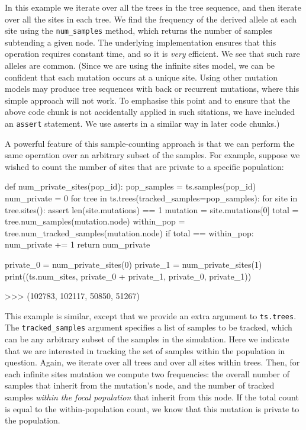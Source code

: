\documentclass[graybox]{svmult}
\begin{document}
In this example we iterate over all the trees in the tree sequence, and
then iterate over all the sites in each tree. We find the frequency
of the derived allele at each site using the \texttt{num\_samples}
method, which returns the number of samples subtending a given
node. The underlying implementation ensures that this operation requires
constant time, and so it is \emph{very} efficient. We see that such rare alleles are common.
(Since we are using the infinite sites model, we can be confident that
each mutation occurs at a unique site. Using other mutation models may produce
tree sequences with back or recurrent mutations, where this simple approach
will not work. To emphasise this point and to ensure that
the above code chunk is not accidentally applied in such sitations, we have included an
\texttt{assert} statement. We use asserts in a similar way in later code chunks.)

A powerful feature of this sample-counting approach is that we can
perform the same operation over an arbitrary subset of the samples. For
example, suppose we wished to count the number of sites that are private
to a specific population:

\begin{pythoncode}
def num_private_sites(pop_id):
    pop_samples = ts.samples(pop_id)
    num_private = 0
    for tree in ts.trees(tracked_samples=pop_samples):
        for site in tree.sites():
            assert len(site.mutations) == 1
            mutation = site.mutations[0]
            total = tree.num_samples(mutation.node)
            within_pop = tree.num_tracked_samples(mutation.node)
            if total == within_pop:
                num_private += 1
    return num_private

private_0 = num_private_sites(0)
private_1 = num_private_sites(1)
print((ts.num_sites, private_0 + private_1, private_0, private_1))

>>> (102783, 102117, 50850, 51267)
\end{pythoncode}

    This example is similar, except that we provide an extra argument to
\texttt{ts.trees}. The \texttt{tracked\_samples} argument specifies a list of samples to be tracked, which can be
any arbitrary subset of the samples in the simulation. Here we indicate
that we are interested in tracking the set of samples within the
population in question. Again, we iterate over all trees and over all
sites within trees. Then, for each infinite sites mutation we
compute two frequencies: the overall number of samples that inherit from
the mutation's node, and the number of tracked samples \emph{within the focal
population} that inherit from this node. If the total count is
equal to the within-population count, we know that this mutation is private to the population.
\end{document}
